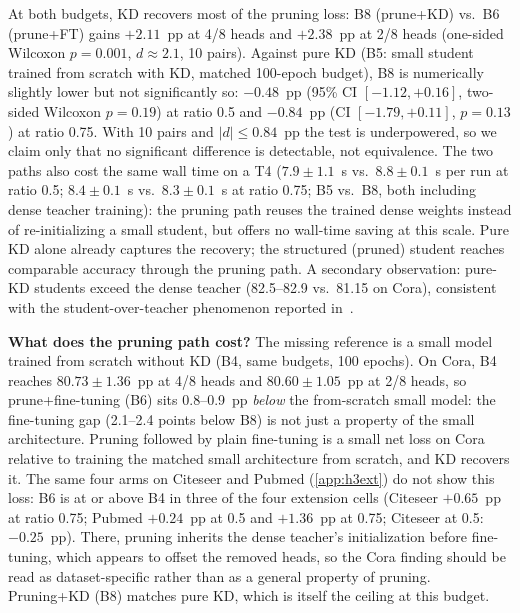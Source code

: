 \documentclass{ws-ijprai}
\begin{document}
At both budgets, KD recovers most of the pruning loss: B8 (prune+KD) vs.\ B6
(prune+FT) gains $+2.11$~pp at 4/8 heads and $+2.38$~pp at 2/8 heads (one-sided
Wilcoxon $p=0.001$, $d\approx2.1$, 10 pairs). Against pure KD (B5: small
student trained from scratch with KD, matched 100-epoch budget), B8 is
numerically slightly lower but not significantly so: $-0.48$~pp (95\% CI
$[-1.12, +0.16]$, two-sided Wilcoxon $p=0.19$) at ratio 0.5 and $-0.84$~pp
(CI $[-1.79, +0.11]$, $p=0.13$) at ratio 0.75. With 10 pairs and
$|d| \le 0.84$~pp the test is underpowered, so we claim only that no
significant difference is detectable, not equivalence. The two paths also cost
the same wall time on a T4 ($7.9 \pm 1.1$~s vs.\ $8.8 \pm 0.1$~s per run at
ratio 0.5; $8.4 \pm 0.1$~s vs.\ $8.3 \pm 0.1$~s at ratio 0.75; B5 vs.\ B8,
both including dense teacher training): the pruning path reuses the trained
dense weights instead of re-initializing a small student, but offers no
wall-time saving at this scale. Pure KD alone already captures the recovery;
the structured (pruned) student reaches comparable accuracy through the
pruning path. A secondary observation: pure-KD students exceed the dense
teacher (82.5--82.9 vs.\ 81.15 on Cora), consistent with the
student-over-teacher phenomenon reported in~\cite{krd2023}.

\noindent\textbf{What does the pruning path cost?} The missing reference is a
small model trained from scratch without KD (B4, same budgets, 100 epochs).
On Cora, B4 reaches $80.73 \pm 1.36$~pp at 4/8 heads and
$80.60 \pm 1.05$~pp at 2/8 heads, so prune+fine-tuning (B6) sits
0.8--0.9~pp \emph{below} the from-scratch small model: the fine-tuning gap
(2.1--2.4 points below B8) is not just a property of the small
architecture. Pruning followed by plain fine-tuning is a small net loss on
Cora relative to training the matched small architecture from scratch, and KD
recovers it. The same four arms on Citeseer and Pubmed
(\ref{app:h3ext}) do not show this loss: B6 is at or above B4 in
three of the four extension cells (Citeseer $+0.65$~pp at ratio 0.75; Pubmed
$+0.24$~pp at 0.5 and $+1.36$~pp at 0.75; Citeseer at 0.5: $-0.25$~pp).
There, pruning inherits the dense teacher's initialization before fine-tuning,
which appears to offset the removed heads, so the Cora finding should be read
as dataset-specific rather than as a general property of pruning. Pruning+KD
(B8) matches pure KD, which is itself the ceiling at this budget.


\end{document}
